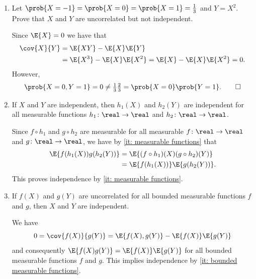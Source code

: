 \begin{exercise}
\begin{enumerate}[label=(\alph*),noitemsep]
        \item Let \(\prob{X=-1} = \prob{X=0} = \prob{X=1} = \frac13\) and \(Y =
        X^2\). Prove that \(X\) and \(Y\) are uncorrelated but not independent.
        \begin{solution}
            Since \(\E{X} = 0\) we have that
            \begin{align*}
                \cov{X}{Y}
                &= \E{XY} - \E{X}\E{Y}
                \\
                &= \E{X^3} - \E{X}\E{X^2}
                = \E{X} - \E{X}\E{X^2}
                = 0.
            \end{align*}
            However, 
            \[
                \prob{X=0, Y=1} =0 \neq \tfrac13 \tfrac23 = \prob{X=0}\prob{Y=1}.
                \qedhere
            \]
        \end{solution}

        \item If \(X\) and \(Y\) are independent, then \(h_1(X)\) and \(h_2(Y)\) are independent
        for all measurable functions \(h_1\colon \real \to \real\) and \(h_2\colon \real \to \real\).
        \begin{solution}
            Since \(f\circ h_1\) and \(g \circ h_2\) are measurable for all
            measurable \(f\colon \real \to \real\) and \(g\colon \real \to \real\), we have by \ref{it: measurable
            functions} that
            \begin{align*}
                \E{f(h_1(X))g(h_2(Y))}
                &= \E{(f\circ h_1)(X)(g\circ h_2)(Y)}
                \\
                &= \E{f(h_1(X))}\E{g(h_2(Y))}.
            \end{align*}
            This proves independence by \ref{it: measurable functions}. 
        \end{solution}

        \item\label{it: all transformations uncorrelated implies independence}
        If \(f(X)\) and \(g(Y)\) are uncorrelated for all bounded
        measurable functions \(f\) and \(g\), then \(X\) and \(Y\) are
        independent.
        \begin{solution}
            We have
            \[
                0 = \cov{f(X)}{g(Y)} = \E{f(X),g(Y)} - \E{f(X)}\E{g(Y)}
            \]
            and consequently \(\E{f(X)g(Y)} = \E{f(X)}\E{g(Y)}\) for all
            bounded measurable functions \(f\) and \(g\).  This implies
            independence by \ref{it: bounded measurable functions}.
        \end{solution}
    \end{enumerate}


\end{exercise}
